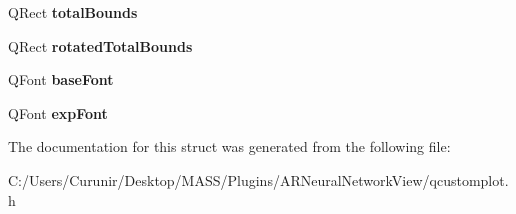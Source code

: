 \begin{DoxyCompactItemize}
Q\+Rect {\bfseries total\+Bounds}
\item 
\mbox{\label{struct_q_c_p_axis_painter_private_1_1_tick_label_data_aa4d38c5ea47c9184a78ee33ae7f1012e}} 
Q\+Rect {\bfseries rotated\+Total\+Bounds}
\item 
\mbox{\label{struct_q_c_p_axis_painter_private_1_1_tick_label_data_a0d4958a706debaa8d19a9b65fc090d56}} 
Q\+Font {\bfseries base\+Font}
\item 
\mbox{\label{struct_q_c_p_axis_painter_private_1_1_tick_label_data_adc10767ebcb719d6927c012a38b9d933}} 
Q\+Font {\bfseries exp\+Font}
\end{DoxyCompactItemize}


The documentation for this struct was generated from the following file\+:\begin{DoxyCompactItemize}
\item 
C\+:/\+Users/\+Curunir/\+Desktop/\+M\+A\+S\+S/\+Plugins/\+A\+R\+Neural\+Network\+View/qcustomplot.\+h\end{DoxyCompactItemize}
